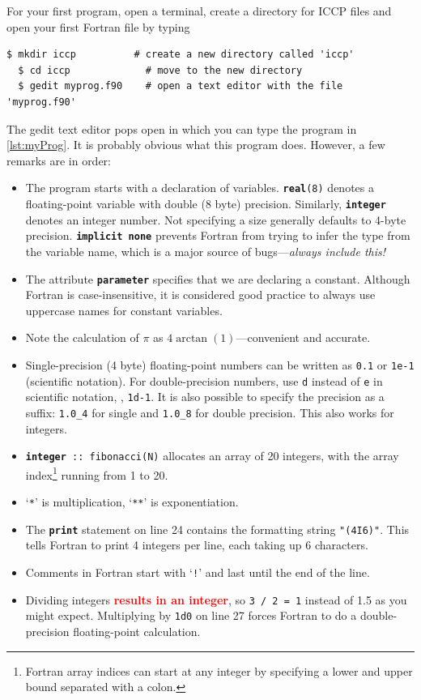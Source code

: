 \documentclass[openany,oneside]{report}
\newcommand{\keyword}[1]{\texttt{\bfseries\color{DarkBlue}#1}}
\newcommand{\str}[1]{\texttt{\color{DarkRed}#1}}
\begin{document}
For your first program, open a terminal, create a directory for ICCP files and open your first Fortran file by typing
\begin{lstlisting}[style=Bash, nolol]
  $ mkdir iccp          # create a new directory called 'iccp'
  $ cd iccp             # move to the new directory
  $ gedit myprog.f90    # open a text editor with the file 'myprog.f90'
\end{lstlisting}
The gedit text editor pops open in which you can type the program in \autoref{lst:myProg}.
It is probably obvious what this program does. However, a few remarks are in order:
\begin{itemize}
  \item The program starts with a declaration of variables.
    \texttt{\keyword{real}(8)} denotes a floating-point variable with double (8 byte) precision. 
    Similarly, \keyword{integer} denotes an integer number.
    Not specifying a size generally defaults to 4-byte precision.
    \keyword{implicit none} prevents Fortran from trying to infer the type from the variable name, which is a major source of bugs---\emph{always include this!}
  \item The attribute \keyword{parameter} specifies that we are declaring a constant.
    Although Fortran is case-insensitive, it is considered good practice to always use uppercase names for constant variables.
  \item Note the calculation of $\pi$ as $4\arctan(1)$---convenient and accurate.
  \item Single-precision (4 byte) floating-point numbers can be written as \texttt{0.1} or \texttt{1e-1} (scientific notation). 
    For double-precision numbers, use \texttt{d} instead of \texttt{e} in scientific notation, \eg, \texttt{1d-1}. 
    It is also possible to specify the precision as a suffix: \texttt{1.0\_4} for single and \texttt{1.0\_8} for double precision. 
    This also works for integers.
  \item \texttt{\keyword{integer} :: fibonacci(N)} allocates an array of 20 
    integers, with the array index\footnote{Fortran array indices can start at 
    any integer by specifying a lower and upper bound separated with a colon.} running from 1 to 20.
  \item `\texttt{*}' is multiplication, `\texttt{**}' is exponentiation.
  \item The \keyword{print} statement on line 24 contains the formatting string \str{"(4I6)"}. 
    This tells Fortran to print 4 integers per line, each taking up 6 characters.
  \item Comments in Fortran start with `\texttt{!}' and last until the end of the line.
  \item Dividing integers \textcolor{red}{\textbf{results in an integer}}, so \texttt{3 / 2 = 1} instead of 1.5 as you might expect. 
    Multiplying by \texttt{1d0} on line 27 forces Fortran to do a double-precision floating-point calculation.
\end{itemize}
\end{document}
